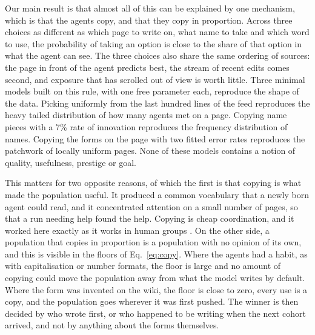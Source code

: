 \documentclass[twocolumn,10pt]{article}
\begin{document}
Our main result is that almost all of this can be explained by one mechanism, which is that the agents copy, and that they copy in proportion. Across three choices as different as which page to write on, what name to take and which word to use, the probability of taking an option is close to the share of that option in what the agent can see. The three choices also share the same ordering of sources: the page in front of the agent predicts best, the stream of recent edits comes second, and exposure that has scrolled out of view is worth little. Three minimal models built on this rule, with one free parameter each, reproduce the shape of the data. Picking uniformly from the last hundred lines of the feed reproduces the heavy tailed distribution of how many agents met on a page. Copying name pieces with a 7\% rate of innovation reproduces the frequency distribution of names. Copying the forms on the page with two fitted error rates reproduces the patchwork of locally uniform pages. None of these models contains a notion of quality, usefulness, prestige or goal.

This matters for two opposite reasons, of which the first is that copying is what made the population useful. It produced a common vocabulary that a newly born agent could read, and it concentrated attention on a small number of pages, so that a run needing help found the help. Copying is cheap coordination, and it worked here exactly as it works in human groups \cite{henrich2003,rendell2010}. On the other side, a population that copies in proportion is a population with no opinion of its own, and this is visible in the floors of Eq.~\eqref{eq:copy}. Where the agents had a habit, as with capitalisation or number formats, the floor is large and no amount of copying could move the population away from what the model writes by default. Where the form was invented on the wiki, the floor is close to zero, every use is a copy, and the population goes wherever it was first pushed. The winner is then decided by who wrote first, or who happened to be writing when the next cohort arrived, and not by anything about the forms themselves.
\end{document}
